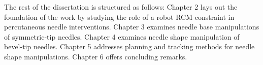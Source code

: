 The rest of the dissertation is structured as follows: Chapter 2 lays out the foundation of the work by studying the role of a robot RCM constraint in percutaneous needle interventions. Chapter 3 examines needle base manipulations of symmetric-tip needles. Chapter 4 examines needle shape manipulation of bevel-tip needles. Chapter 5 addresses planning and tracking methods for needle shape manipulations. Chapter 6 offers concluding remarks.

